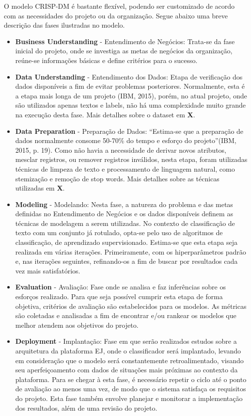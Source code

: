 O modelo CRISP-DM é bastante flexível, podendo ser customizado de acordo com as necessidades do projeto ou da organização. Segue abaixo uma breve descrição das fases ilustradas no modelo.

\begin{itemize}
    \item \textbf{Business Understanding} - Entendimento de Negócios: Trata-se da fase inicial do projeto, onde se investiga as metas de negócios da organização, reúne-se informações básicas e define critérios para o sucesso.
    \item \textbf{Data Understanding} - Entendimento dos Dados: Etapa de verificação dos dados disponíveis a fim de evitar problemas posteriores. Normalmente, esta é a etapa mais longa de um projeto (IBM, 2015), porém, no atual projeto, onde são utilizados apenas textos e labels, não há uma complexidade muito grande na execução desta fase. Mais detalhes sobre o dataset em \textbf{X}.
    \item \textbf{Data Preparation} - Preparação de Dados: “Estima-se que a preparação de dados normalmente consome 50-70\% do tempo e esforço do projeto”(IBM, 2015, p. 19). Como não havia a necessidade de derivar novos atributos, mesclar registros, ou remover registros inválidos, nesta etapa, foram utilizadas técnicas de limpeza de texto e processamento de linguagem natural, como stemização e remoção de stop words. Mais detalhes sobre as técnicas utilizadas em \textbf{X}.
    \item \textbf{Modeling} - Modelando: Nesta fase, a natureza do problema e das metas definidas no Entendimento de Negócios e os dados disponíveis definem as técnicas de modelagem a serem utilizadas. No contexto de classificação de texto com um conjunto já rotulado, opta-se pelo uso de algoritmos de classificação, de aprendizado supervisionado. Estima-se que esta etapa seja realizada em várias iterações. Primeiramente, com os hiperparâmetros padrão e, nas iterações seguintes, refinando-os a fim de buscar por resultados cada vez mais satisfatórios.
    \item \textbf{Evaluation} - Avaliação: Fase onde se analisa e faz inferências sobre os esforços realizado. Para que seja possível cumprir esta etapa de forma objetiva, critérios de avaliação são estabelecidos para os modelos. As métricas são coletadas e analisadas a fim de encontrar e/ou rankear os modelos que melhor atendem aos objetivos do projeto.
    \item \textbf{Deployment} - Implantação: Fase em que serão realizados estudos sobre a arquitetura da plataforma EJ, onde o classificador será implantado, levando em consideração que o modelo será constantemente retroalimentado, visando seu aperfeiçoamento com dados de situações mais próximas ao contexto da plataforma. Para se chegar à esta fase, é necessário repetir o ciclo até o ponto de avaliação ao menos uma vez, de modo que o sistema satisfaça os requisitos do projeto. Esta fase também envolve planejar e monitorar a implementação dos resultados, além de uma revisão do projeto.
\end{itemize}

